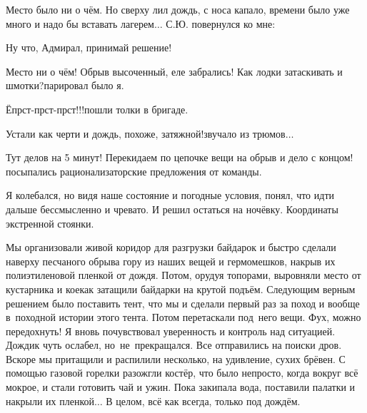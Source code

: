
Место было ни о чём. Но сверху лил дождь, с носа капало, времени было уже много и надо бы вставать лагерем$\ldots$ С.Ю. повернулся ко мне: 

\diagdash Ну что, Адмирал, принимай решение! 

\diagdash Место ни о чём! Обрыв высоченный, еле забрались! Как лодки затаскивать и шмотки?\mdash парировал было я.

\diagdash Ёпрст-прст-прст!!!\mdash пошли толки в бригаде.

\diagdash Устали как черти и дождь, похоже, затяжной!\mdash звучало из трюмов$\ldots$

\diagdash Тут делов на 5 минут! Перекидаем по цепочке вещи на обрыв и дело с концом!\mdash посыпались рационализаторские предложения от команды.

Я колебался, но видя наше состояние и погодные условия, понял, что идти дальше бессмысленно и чревато. И решил остаться на ночёвку. Координаты экстренной стоянки\mdash \CoordsChagodoschaSixteenEmergencyNignt.

Мы организовали живой коридор для разгрузки байдарок и быстро сделали наверху песчаного обрыва гору из наших вещей и гермомешков, накрыв их полиэтиленовой пленкой от дождя. Потом, орудуя топорами, выровняли место от кустарника и кое\sdash как затащили байдарки на крутой подъём. Следующим верным решением было поставить тент, что мы и сделали первый раз за поход и вообще в~походной истории этого тента. Потом перетаскали под~него вещи. Фух, можно передохнуть! Я вновь почувствовал уверенность и контроль над ситуацией. Дождик чуть ослабел, но~не~прекращался. Все отправились на поиски дров. Вскоре мы притащили и распилили несколько, на удивление, сухих брёвен. С помощью газовой горелки разожгли костёр, что было непросто, когда вокруг всё мокрое, и стали готовить чай и ужин. Пока закипала вода, поставили палатки и накрыли их пленкой$\ldots$ В целом, всё как всегда, только под дождём. 


